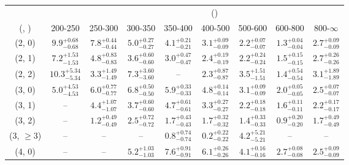 \begin{table}[h!]
\tiny
\centering
{}
\begin{tabular}
{ccccccccc}
	\hline\hline
&	& \multicolumn{8}{c}{\scalht (\gev)} \\ 
	 (\njet,  \nb) & 200-250 & 250-300 & 300-350 & 350-400 & 400-500 & 500-600 & 600-800 & 800-$\infty$ \\ [0.8ex] 
\hline
	(2, 0) & $9.9^{+ 0.68 }_{- 0.68 }$ & $7.8^{+ 0.44 }_{- 0.44 }$ & $5.0^{+ 0.27 }_{- 0.27 }$ & $4.1^{+ 0.21 }_{- 0.21 }$ & $3.1^{+ 0.09 }_{- 0.09 }$ & $2.2^{+ 0.07 }_{- 0.07 }$ & $1.3^{+ 0.04 }_{- 0.04 }$ & $2.7^{+ 0.09 }_{- 0.09 }$ \\[0.5ex] 
	(2, 1) & $7.2^{+ 1.53 }_{- 1.53 }$ & $4.8^{+ 0.83 }_{- 0.83 }$ & $3.6^{+ 0.60 }_{- 0.60 }$ & $3.0^{+ 0.47 }_{- 0.47 }$ & $2.4^{+ 0.19 }_{- 0.19 }$ & $2.2^{+ 0.24 }_{- 0.24 }$ & $1.5^{+ 0.15 }_{- 0.15 }$ & $2.7^{+ 0.26 }_{- 0.26 }$ \\[0.5ex] 
	(2, 2) & $10.3^{+ 5.34 }_{- 5.34 }$ & $3.3^{+ 1.49 }_{- 1.49 }$ & $7.3^{+ 3.60 }_{- 3.60 }$ & -- & $2.3^{+ 0.87 }_{- 0.87 }$ & $3.5^{+ 1.51 }_{- 1.51 }$ & $1.4^{+ 0.54 }_{- 0.54 }$ & $3.1^{+ 1.89 }_{- 1.89 }$ \\[0.5ex] 
	(3, 0) & $5.0^{+ 4.53 }_{- 4.53 }$ & $6.0^{+ 0.77 }_{- 0.77 }$ & $6.8^{+ 0.50 }_{- 0.50 }$ & $5.9^{+ 0.33 }_{- 0.33 }$ & $4.8^{+ 0.14 }_{- 0.14 }$ & $3.1^{+ 0.09 }_{- 0.09 }$ & $2.0^{+ 0.05 }_{- 0.05 }$ & $2.5^{+ 0.07 }_{- 0.07 }$ \\[0.5ex] 
	(3, 1) & -- & $4.4^{+ 1.07 }_{- 1.07 }$ & $3.7^{+ 0.60 }_{- 0.60 }$ & $4.7^{+ 0.61 }_{- 0.61 }$ & $3.3^{+ 0.27 }_{- 0.27 }$ & $2.2^{+ 0.18 }_{- 0.18 }$ & $1.6^{+ 0.11 }_{- 0.11 }$ & $2.2^{+ 0.17 }_{- 0.17 }$ \\[0.5ex] 
	(3, 2) & -- & $1.2^{+ 0.49 }_{- 0.49 }$ & $2.5^{+ 0.72 }_{- 0.72 }$ & $1.7^{+ 0.43 }_{- 0.43 }$ & $1.7^{+ 0.32 }_{- 0.32 }$ & $1.4^{+ 0.33 }_{- 0.33 }$ & $0.9^{+ 0.20 }_{- 0.20 }$ & $1.7^{+ 0.49 }_{- 0.49 }$ \\[0.5ex] 
	(3, $\ge3$) & -- & -- & -- & $0.8^{+ 0.74 }_{- 0.74 }$ & $0.2^{+ 0.22 }_{- 0.22 }$ & $4.2^{+ 5.21 }_{- 5.21 }$ & -- & -- \\[0.5ex] 
	(4, 0) & -- & -- & $5.2^{+ 1.03 }_{- 1.03 }$ & $7.6^{+ 0.91 }_{- 0.91 }$ & $6.1^{+ 0.26 }_{- 0.26 }$ & $4.1^{+ 0.16 }_{- 0.16 }$ & $2.7^{+ 0.08 }_{- 0.08 }$ & $2.5^{+ 0.09 }_{- 0.09 }$ \\[0.5ex] 

\end{tabular}
\end{table}
